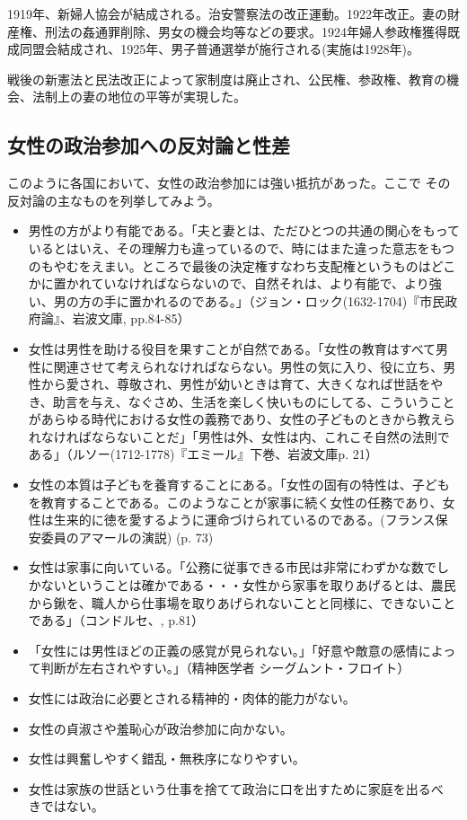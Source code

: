 \documentclass[dvipdfmx,uplatex]{jsarticle}
\begin{document}
1919年、新婦人協会が結成される。治安警察法の改正運動。1922年改正。妻の財産権、刑法の姦通罪削除、男女の機会均等などの要求。1924年婦人参政権獲得既成同盟会結成され、1925年、男子普通選挙が施行される(実施は1928年)。


戦後の新憲法と民法改正によって家制度は廃止され、公民権、参政権、教育の機会、法制上の妻の地位の平等が実現した。


\subsection{女性の政治参加への反対論と性差}

このように各国において、女性の政治参加には強い抵抗があった。ここで
その反対論の主なものを列挙してみよう。

\begin{itemize}

\item 男性の方がより有能である。「夫と妻とは、ただひとつの共通の関心をもっているとはいえ、その理解力も違っているので、時にはまた違った意志をもつのもやむをえまい。ところで最後の決定権すなわち支配権というものはどこかに置かれていなければならないので、自然それは、より有能で、より強い、男の方の手に置かれるのである。」（ジョン・ロック(1632-1704)『市民政府論』、岩波文庫, pp.84-85）

\item 女性は男性を助ける役目を果すことが自然である。「女性の教育はすべて男性に関連させて考えられなければならない。男性の気に入り、役に立ち、男性から愛され、尊敬され、男性が幼いときは育て、大きくなれば世話をやき、助言を与え、なぐさめ、生活を楽しく快いものにしてる、こういうことがあらゆる時代における女性の義務であり、女性の子どものときから教えられなければならないことだ」「男性は外、女性は内、これこそ自然の法則である」（ルソー(1712-1778)『エミール』下巻、岩波文庫p. 21）

\item 女性の本質は子どもを養育することにある。「女性の固有の特性は、子どもを教育することである。このようなことが家事に続く女性の任務であり、女性は生来的に徳を愛するように運命づけられているのである。(フランス保安委員のアマールの演説) (\citet{奥田暁子03:フェミニズム思想史}p. 73)

\item 女性は家事に向いている。「公務に従事できる市民は非常にわずかな数でしかないということは確かである・・・女性から家事を取りあげるとは、農民から鍬を、職人から仕事場を取りあげられないことと同様に、できないことである」（コンドルセ、\citet{奥田暁子03:フェミニズム思想史}, p.81）


\item 「女性には男性ほどの正義の感覚が見られない。」「好意や敵意の感情によって判断が左右されやすい。」（精神医学者 シーグムント・フロイト）

\item 女性には政治に必要とされる精神的・肉体的能力がない。
\item 女性の貞淑さや羞恥心が政治参加に向かない。
\item 女性は興奮しやすく錯乱・無秩序になりやすい。
\item 女性は家族の世話という仕事を捨てて政治に口を出すために家庭を出るべ
  きではない。

\end{itemize}
 
\end{document}
